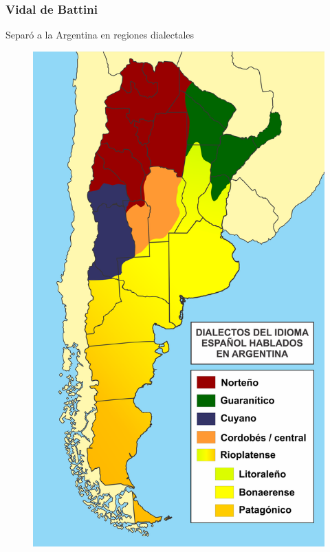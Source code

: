 

\begin{frame}[c]\frametitle{Vidal de Battini}
    
Separó a la Argentina en regiones dialectales
\begin{figure}
 \includegraphics[height=0.7\textheight]{../src/images/presentacion/regiones_dialectales.png}
\end{figure}
\end{frame}


